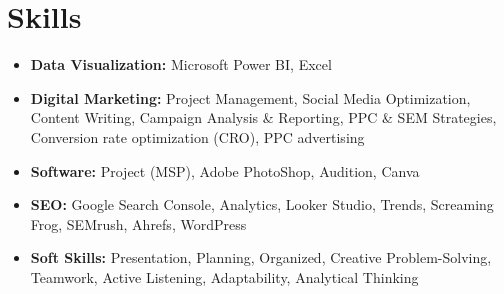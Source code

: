 \documentclass[11pt,a4paper,sans]{moderncv}
\begin{document}
\section{Skills}
{\begin{itemize}[label=\textbullet]
\item {\textbf{Data Visualization:} Microsoft Power BI, Excel}
\item {\textbf{Digital Marketing:} Project Management, Social Media Optimization, Content Writing, Campaign Analysis \& Reporting, PPC \& SEM Strategies, Conversion rate optimization (CRO), PPC advertising}
\item {\textbf{Software:} Project (MSP), Adobe PhotoShop, Audition, Canva}
\item {\textbf{SEO:} Google Search Console, Analytics, Looker Studio, Trends, Screaming Frog, SEMrush, Ahrefs, WordPress}
\item {\textbf{Soft Skills:} Presentation, Planning, Organized, Creative Problem-Solving, Teamwork, Active Listening, Adaptability, Analytical Thinking}
\end{itemize}}
\end{document}
